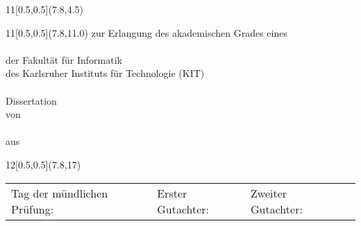 \begin{titlepage}
\thispagestyle{empty}

%
\mbox{}%
 	\begin{textblock}{11}[0.5,0.5](7.8,4.5)
		\sffamily%
		\LARGE%
 		\centering%
		\textbf{\WorktitleDivided}
 	\end{textblock}

 	\begin{textblock}{11}[0.5,0.5](7.8,11.0)
 		\sffamily%
		\centering%
		zur Erlangung des akademischen Grades eines\\%
		\vspace{0.5\baselineskip}%
		\Large%
		\DocDegree%
		\vspace{1\baselineskip}\\%
		\normalsize%
		der Fakultät für Informatik\texorpdfstring{\\}{}%
		des Karlsruher Instituts für Technologie (KIT)%
		\vspace{0.75\baselineskip}\\%
%
		\vspace{0.5\baselineskip}\\%
		\Large%
		{Dissertation}%
		\vspace{0.5\baselineskip}\\%
		\normalsize%
		von%
		\vspace{0.5\baselineskip}\\%
		\Large%
		\textbf{\Authorname}%
		\vspace{0.5\baselineskip}\\%
		\normalsize%
		aus \PlaceOfBirth%
 	\end{textblock}

	\begin{textblock}{12}[0.5,0.5](7.8,17)
	\sffamily%
	\raggedleft%
		\begin{tabular}{p{5cm}l}
			Tag der mündlichen Prüfung: & \ExamDate\texorpdfstring{\\}{}
			Erster Gutachter: & \Reviewer\texorpdfstring{\\}{}
			Zweiter Gutachter: & \Supervisor\texorpdfstring{\\}{}
		\end{tabular}
 	\end{textblock}
	
\end{titlepage}